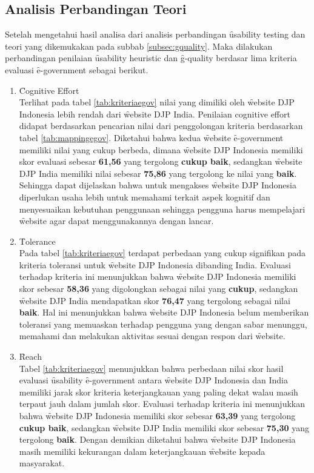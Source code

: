 \subsection{Analisis Perbandingan Teori}
Setelah mengetahui hasil analisa dari analisis perbandingan \f{usability testing} dan teori yang dikemukakan pada subbab \ref{subsec:gquality}. Maka dilakukan perbandingan penilaian \f{usability heuristic} dan \f{g-quality} berdasar lima kriteria evaluasi \f{e-government} sebagai berikut.
\begin{enumerate}
	\item \f{Cognitive Effort}\\
	Terlihat pada tabel \ref{tab:kriteriaegov} nilai yang dimiliki oleh \f{website} DJP Indonesia lebih rendah dari \f{website} DJP India. Penilaian cognitive effort didapat berdasarkan pencarian nilai dari penggolongan kriteria berdasarkan tabel \ref{tab:mappingegov}. Diketahui bahwa kedua \f{website} \f{e-government} memiliki nilai yang cukup berbeda, dimana \f{website} DJP Indonesia memiliki skor evaluasi sebesar \textbf{61,56} yang tergolong \textbf{cukup baik}, sedangkan \f{website} DJP India memiliki nilai sebesar \textbf{75,86} yang tergolong ke nilai yang \textbf{baik}. Sehingga dapat dijelaskan bahwa untuk mengakses \f{website} DJP Indonesia diperlukan usaha lebih untuk memahami terkait aspek kognitif dan menyesuaikan kebutuhan penggunaan sehingga pengguna harus mempelajari \f{website} agar dapat menggunakannya dengan lancar.
	\item \f{Tolerance}\\
	Pada tabel \ref{tab:kriteriaegov} terdapat perbedaan yang cukup signifikan pada kriteria toleransi untuk \f{website} DJP Indonesia dibanding India. Evaluasi terhadap kriteria ini menunjukkan bahwa \f{website} DJP Indonesia memiliki skor sebesar \textbf{58,36} yang digolongkan sebagai nilai yang \textbf{cukup}, sedangkan \f{website} DJP India mendapatkan skor \textbf{76,47} yang tergolong sebagai nilai \textbf{baik}. Hal ini menunjukkan bahwa \f{website} DJP Indonesia belum memberikan toleransi yang memuaskan terhadap pengguna yang dengan sabar menunggu, memahami dan melakukan aktivitas sesuai dengan respon dari \f{website}. 
	\item \f{Reach}\\
	Tabel \ref{tab:kriteriaegov} menunjukkan bahwa perbedaan nilai skor hasil evaluasi \f{usability} \f{e-government} antara \f{website} DJP Indonesia dan India memiliki jarak skor kriteria keterjangkauan yang paling dekat walau masih terpaut jauh dalam jumlah skor. Evaluasi terhadap kriteria ini menunjukkan bahwa \f{website} DJP Indonesia memiliki skor sebesar \textbf{63,39} yang tergolong \textbf{cukup baik}, sedangkan \f{website} DJP India memiliki skor sebesar \textbf{75,30} yang tergolong \textbf{baik}. Dengan demikian diketahui bahwa \f{website} DJP Indonesia masih memiliki kekurangan dalam keterjangkauan \f{website} kepada masyarakat.

\end{enumerate}
